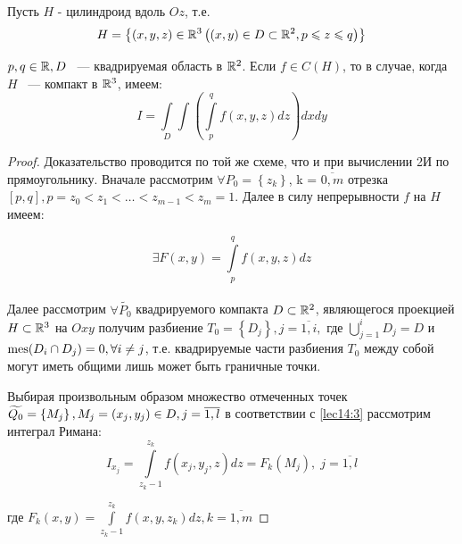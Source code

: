 \documentclass[../../main.tex]{subfiles}
\begin{document}
	
	\begin{theorem}
		Пусть $H$ - цилиндроид вдоль $Oz$, т.е.
		\begin{equation}
			H = \left\{(x, y, z) \in \mathbb{R}^3 \left(\left(x, y\right) \in D \subset \mathbb{R}^2, p \leqslant z \leqslant q\right) \right\}
			\label{lec14:1}
		\end{equation}
		
		 $p, q \in \mathbb{R}, D$ ~--- квадрируемая область в $\mathbb{R}^2$. Если $f \in C(H)$, то в случае, когда $H$ ~--- компакт в $\mathbb{R}^3$, имеем:
		\begin{equation}
		\label{lec14:2}
		I = \int\limits_{D} \int \left(\int\limits_p^q f\left(x, y, z\right)dz\right)dxdy 
		\end{equation}
	\end{theorem}
		
	\begin{proof}
		Доказательство проводится по той же схеме, что и при вычислении 2И по прямоугольнику. Вначале рассмотрим $\forall P_0 = \left\{ z_k \right\}$, k = $\overline{0, m}$ отрезка $\left[p, q\right], p = z_0 < z_1 < \ldots < z_{m - 1} < z_m = 1.$ Далее в силу непрерывности $f$ на $H$ имеем:
		
		\begin{equation}
		\exists F\left(x, y\right) = \int\limits_{p}^{q} f\left(x, y, z\right) dz
		\label{lec14:3}
		\end{equation}\\
		Далее рассмотрим $\forall \widetilde{P_0}$ квадрируемого компакта $D \subset \mathbb{R}^2$, являющегося проекцией $H \subset \mathbb{R}^3$ на $Oxy$ получим разбиение $T_0 = \left\{D_j \right\}, j = \overline{1, i}, \text{ где } \bigcup\limits_{j = 1}^i D_j = D$ и $\operatorname{mes}(D_i \cap D_j) = 0 , \forall i \neq j$, т.е. квадрируемые части разбиения $T_0$ между собой могут иметь общими лишь может быть граничные точки.
		
		Выбирая произвольным образом множество отмеченных точек $\widetilde{Q_0} = \left\{ M_j \right\},\\ M_j = \left(x_j, y_j\right) \in D, j = \overline{1, l}$ в соответствии с \eqref{lec14:3} рассмотрим интеграл Римана:
		\begin{equation} 
		I_{x_j} = \int\limits_{z_k - 1}^{z_k} f(x_j, y_j, z)dz = F_k (M_j),\; j = \overline{1, l}  \label{lec14:4}
		\end{equation}
		
		где $F_k(x, y) = \int\limits_{z_k - 1}^{z_k} f\left(x, y, z_k\right)dz, k = \overline{1, m}$
		 

\end{proof}
\end{document}
